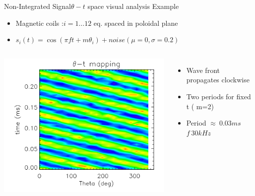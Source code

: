 \documentclass{beamer}
\begin{document}
\begin{frame}{Non-Integrated Signal}{$\theta- t$ space visual analysis }
Example
\begin{itemize}
\item Magnetic coils :$ i=1 \ldots 12 $  eq. spaced in poloidal plane
\item $s_i(t) = \cos(\pi f t + m \theta_i) + noise(\mu=0,\sigma=0.2)$
\end{itemize}
\begin{columns}
	\begin{center}
	\includegraphics[width=0.8 \columnwidth]{figures/visual-analy.png}
	\end{center}
\begin{itemize}
\item Wave front propagates clockwise
\item Two periods for fixed t ( m=2)
\item Period $\approx~0.03ms$ $ f~30kHz$
\end{itemize}
\end{columns}
\end{frame}
\end{document}
